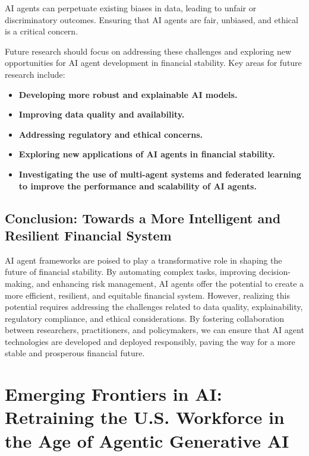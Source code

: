 \documentclass[a4paper,headinclude=on,footinclude=on,12pt,oneside]{scrbook}
\begin{document}
AI agents can perpetuate existing biases in data, leading to unfair or discriminatory outcomes. Ensuring that AI agents are fair, unbiased, and ethical is a critical concern.


Future research should focus on addressing these challenges and exploring new opportunities for AI agent development in financial stability. Key areas for future research include:

\begin{itemize}
\item \textbf{Developing more robust and explainable AI models.}
\item \textbf{Improving data quality and availability.}
\item \textbf{Addressing regulatory and ethical concerns.}
\item \textbf{Exploring new applications of AI agents in financial stability.}
\item \textbf{Investigating the use of multi-agent systems and federated learning to improve the performance and scalability of AI agents.}
\end{itemize}

\section*{Conclusion: Towards a More Intelligent and Resilient Financial System}

AI agent frameworks are poised to play a transformative role in shaping the future of financial stability. By automating complex tasks, improving decision-making, and enhancing risk management, AI agents offer the potential to create a more efficient, resilient, and equitable financial system. However, realizing this potential requires addressing the challenges related to data quality, explainability, regulatory compliance, and ethical considerations. By fostering collaboration between researchers, practitioners, and policymakers, we can ensure that AI agent technologies are developed and deployed responsibly, paving the way for a more stable and prosperous financial future.











\chapter{Emerging Frontiers in AI: Retraining the U.S. Workforce in the Age of Agentic Generative AI}
\end{document}
